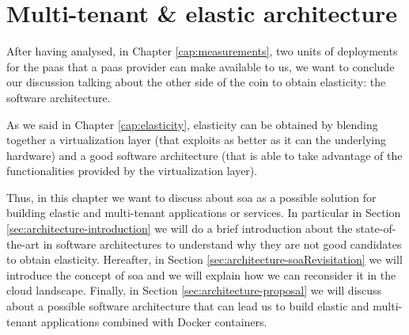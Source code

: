 %
%
\chapter{Multi-tenant \& elastic architecture}
\label{cap:architecture}
After having analysed, in Chapter \ref{cap:measurements}, two units of deployments for the \ac{paas} that
a \ac{paas} provider can make available to us, we want to conclude our discussion talking about the other
side of the coin to obtain elasticity: the software architecture.

As we said in Chapter \ref{cap:elasticity}, elasticity can be obtained by blending together a virtualization
layer (that exploits as better as it can the underlying hardware) and a good software architecture (that is
able to take advantage of the functionalities provided by the virtualization layer).

Thus, in this chapter we want to discuss about \acf{soa} as a possible solution for building elastic and
multi-tenant applications or services. In particular in Section \ref{sec:architecture-introduction} we will
do a brief introduction about the state-of-the-art in software architectures to understand why they are not
good candidates to obtain elasticity. Hereafter, in Section \ref{sec:architecture-soaRevisitation} we will introduce
the concept of \ac{soa} and we will explain how we can reconsider it in the cloud landscape. Finally, in
Section \ref{sec:architecture-proposal} we will discuss about a possible software architecture that can lead 
us to build elastic and multi-tenant applications combined with Docker containers.







